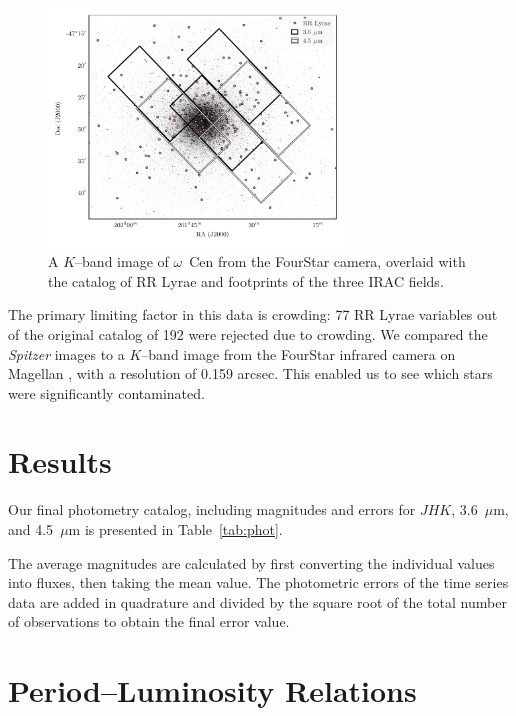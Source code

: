 \documentclass[a4paper,fleqn,usenatbib]{mnras}
\begin{document}
\begin{figure}
\begin{center}
\includegraphics[width=80mm]{final_plots/omegacen_coverage_map.pdf}
\caption{A $K$--band image of $\omega$~Cen from the FourStar camera, overlaid with the catalog of RR Lyrae \citep{2004A&A...424.1101K} and footprints of the three IRAC fields.}
\label{fig:omegaCen_fields}
\end{center}
\end{figure}

The primary limiting factor in this data is crowding: 77 RR Lyrae variables out of the original catalog of 192 \citep{2004A&A...424.1101K} were rejected due to crowding. We compared the {\it Spitzer} images to a $K$--band image from the FourStar infrared camera on Magellan \citep{2013PASP..125..654P}, with a resolution of 0.159 arcsec. This enabled us to see which stars were significantly contaminated. 

\section{Results}

Our final photometry catalog, including magnitudes and errors for $J\!H\!K$, 3.6~$\mu$m, and 4.5~$\mu$m is presented in Table~\ref{tab:phot}.

The average magnitudes are calculated by first converting the individual values into fluxes, then taking the mean value. The photometric errors of the time series data are added in quadrature and divided by the square root of the total number of observations to obtain the final error value.

\section{Period--Luminosity Relations}
\label{sec:pl_relation}
\end{document}
